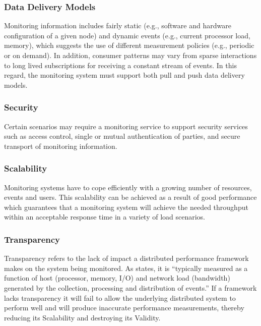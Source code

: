 \subsubsection{Data Delivery Models}

Monitoring information includes fairly static (e.g., software and hardware configuration of a given node) and dynamic
events (e.g., current processor load, memory), which suggests the use of different measurement policies (e.g., periodic
or on demand). In addition, consumer patterns may vary from sparse interactions to long lived subscriptions for
receiving a constant stream of events. In this regard, the monitoring system must support both pull and push data
delivery models.
\cite{zanikolas2005}

\subsubsection{Security}

Certain scenarios may require a monitoring service to support security services such as access control, single or mutual
authentication of parties, and secure transport of monitoring information.
\cite{zanikolas2005}

\subsubsection{Scalability}

Monitoring systems have to cope efficiently with a growing number of resources, events and users. This scalability can
be achieved as a result of good performance which guarantees that a monitoring system will achieve the needed throughput
within an acceptable response time in a variety of load scenarios.
\cite{zanikolas2005}

\subsubsection{Transparency}

Transparency refers to the lack of impact a distributed performance framework makes on the system being monitored. As
\cite{zanikolas2005} states, it is ``typically measured as a function of host (processor, memory, I/O) and network load
(bandwidth) generated by the collection, processing and distribution of events.'' If a framework lacks transparency it
will fail to allow the underlying distributed system to perform well and will produce inaccurate performance
measurements, thereby reducing its Scalability and destroying its Validity.

